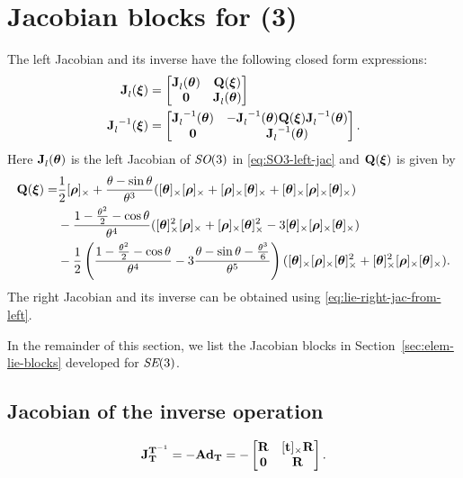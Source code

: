 \section{Jacobian blocks for \SE(3)} \label{sec:Jacobians-SE3}
The left Jacobian and its inverse have the following closed form expressions: 
\begin{align}
{{\boldsymbol{\mathbf{J}}}^{}_{l}}({\boldsymbol{\mathbf{\xi}}}) &= 
\begin{bmatrix}
  {{\boldsymbol{\mathbf{J}}}^{}_{l}}({\boldsymbol{\mathbf{\theta}}}) & {\boldsymbol{\mathbf{Q}}}({\boldsymbol{\mathbf{\xi}}}) \\
  \boldsymbol{\mathbf{0}} & {{\boldsymbol{\mathbf{J}}}^{}_{l}}({\boldsymbol{\mathbf{\theta}}})
\end{bmatrix}\\
{{\boldsymbol{\mathbf{J}}}^{}_{l}}^{-1}({\boldsymbol{\mathbf{\xi}}}) &= 
\begin{bmatrix}
  {{\boldsymbol{\mathbf{J}}}^{}_{l}}^{-1}({\boldsymbol{\mathbf{\theta}}}) & -{{\boldsymbol{\mathbf{J}}}^{}_{l}}^{-1}({\boldsymbol{\mathbf{\theta}}}) {\boldsymbol{\mathbf{Q}}}({\boldsymbol{\mathbf{\xi}}}) {{\boldsymbol{\mathbf{J}}}^{}_{l}}^{-1}({\boldsymbol{\mathbf{\theta}}}) \\
  \boldsymbol{\mathbf{0}} & {{\boldsymbol{\mathbf{J}}}^{}_{l}}^{-1}({\boldsymbol{\mathbf{\theta}}})
\end{bmatrix}.  \label{eq:jacobian-left-inverse-SE3}
\end{align}
Here ${{\boldsymbol{\mathbf{J}}}^{}_{l}}({\boldsymbol{\mathbf{\theta}}})$ is the left Jacobian of $\textit{SO}(3)$ in \eqref{eq:SO3-left-jac} and ${\boldsymbol{\mathbf{Q}}}({\boldsymbol{\mathbf{\xi}}})$ is given by
%
\newcommand{\rhox}{\skewsymm{\vecrho}}
\newcommand{\thetax}{\skewsymm{\vectheta}}
%
\begin{equation}
\begin{split}
\matQ(\vecxi) =& 
  \frac{1}{2}\rhox 
  + \frac{\theta - \sin\theta}{\theta^3}(\thetax\rhox+\rhox\thetax+\thetax\rhox\thetax)\\
  &- \frac{1 - \frac{\theta^2}{2} - \cos\theta}{\theta^4}(\thetax^2\rhox+\rhox\thetax^2-3\thetax\rhox\thetax)\\
  &-\frac{1}{2}\left(\frac{1 -  \frac{\theta^2}{2} - \cos\theta}{\theta^4} 
                  - 3\frac{\theta-\sin\theta-\frac{\theta^3}{6}}{\theta^5}\right)
                  (\thetax\rhox\thetax^2 + \thetax^2\rhox\thetax).
\end{split}
\end{equation}
%
The right Jacobian and its inverse can be obtained using \eqref{eq:lie-right-jac-from-left}.

In the remainder of this section, we list the Jacobian blocks in Section~\ref{sec:elem-lie-blocks} developed for $\textit{SE}(3)$.

\subsection{Jacobian of the inverse operation}
\begin{equation}
  {{\boldsymbol{\mathbf{J}}}^{{\boldsymbol{\mathbf{T}}}^{-1}}_{{\boldsymbol{\mathbf{T}}}}} = -\boldsymbol{\mathbf{Ad}}_{\boldsymbol{\mathbf{T}}} = -
  \begin{bmatrix}
    {\boldsymbol{\mathbf{R}}} & [{\boldsymbol{\mathbf{t}}}]_\times{\boldsymbol{\mathbf{R}}}\\
    \boldsymbol{\mathbf{0}} & {\boldsymbol{\mathbf{R}}}
  \end{bmatrix}.
\end{equation}

